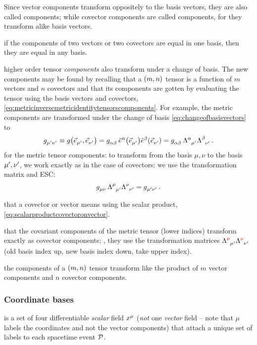  Since vector components transform oppositely to the basis vectors, they are also called  components; while covector components are called  components, for they transform alike basis vectors.

 if the components of two vectors or two covectors are equal in one basis, then they are equal in any basis.

 higher order tensor \emph{components} also transform under a change of basis. The new components may be found by recalling that a $\torder mn$ tensor is a function of $m$ vectors and $n$ covectors and that its components are gotten by evaluating the tensor using the basis vectors and covectors, \cref{eq:metricinversemetricidentitytensorscomponents}. For example, the metric components are transformed under the change of basis \cref{eq:changeofbasisvectors} to
%
\begin{equation}\label{eq:metriccomponentstransformation}
  \tmetric{\aidx\mu}{\aidx\nu} \defas \metric\vat{\tbvec{\aidx\mu},\tbvec{\aidx\nu}}
                                = \tmetric\alpha\beta\,\tbcov\alpha\vat{\tbvec{\aidx\mu}}\tbcov\beta\vat{\tbvec{\aidx\nu}}
                                = \tmetric\alpha\beta\,\ttransmat{\alpha}{\aidx\mu}\ttransmat{\beta}{\aidx\nu}\,.
\end{equation}
%
 for the metric tensor components: to transform from the basis $\mu,\nu$ to the basis ${\mu}\sp{\prime},{\nu}\sp{\prime}$, we work exactly as in the case of covectors: we use the transformation matrix and ESC:
%
\begin{equation*}
  \tmetric\mu\nu\,\ttransmat{\mu}{\aidx\mu}\ttransmat{\nu}{\aidx\nu} = \tmetric{\aidx\mu}{\aidx\nu}\,.
\end{equation*}

 that  a covector or vector means using the scalar product, \cref{eq:scalarproductcovectoronvector}.

 that the covariant components of the metric tensor (lower indices) transform exactly as covector components; \ie, they use the transformation matrices $\ttransmat{\color{red}\mu}{\aidx\mu}\ttransmat{\color{red}\nu}{\aidx\nu}$ (old basis index up, new basis index down, take upper index).

 the components of a $\torder mn$ tensor transform like the product of $m$ vector components and $n$ covector components.

\subsubsection{Coordinate bases}
%
 is a set of four differentiable \emph{scalar} field $\tvec\pos\mu$ (\emph{not} one \emph{vector} field -- note that $\mu$ labels the coordinates and not the vector components) that attach a unique set of labels to each spacetime event $\mathcal{P}$.

